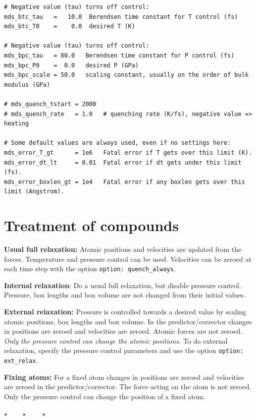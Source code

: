 \documentclass[a4paper,12pt,pdftex,onecolumn]{article}
\newcommand{\stars}{\begin{center}%
\vspace{1em plus 0.5em minus 0.5em}%
$\star \qquad \star \qquad \star$%
\vspace{1em plus 0.5em minus 0.5em}%
\end{center}}
\begin{document}
\begin{Verbatim}[fontsize=\relsize{-1},frame=single]
# Negative value (tau) turns off control:
mds_btc_tau   =   10.0  Berendsen time constant for T control (fs)
mds_btc_T0    =    0.0  desired T (K)

# Negative value (tau) turns off control:
mds_bpc_tau   = 80.0   Berendsen time constant for P control (fs)
mds_bpc_P0    =  0.0   desired P (GPa)
mds_bpc_scale = 50.0   scaling constant, usually on the order of bulk modulus (GPa)

# mds_quench_tstart = 2000
# mds_quench_rate   = 1.0   # quenching rate (K/fs), negative value => heating

# Some default values are always used, even if no settings here:
mds_error_T_gt      = 1e6   Fatal error if T gets over this limit (K).
mds_error_dt_lt     = 0.01  Fatal error if dt gets under this limit (fs).
mds_error_boxlen_gt = 1e4   Fatal error if any boxlen gets over this limit (Angstrom).

\end{Verbatim}




\section{Treatment of compounds}
\label{sec:comptreat}

\textbf{Usual full relaxation:} Atomic positions and
velocities are updated from the forces.
Temperature and pressure control can be used.
Velocities can be zeroed at each time step with the option \verb+option: quench_always+.

\textbf{Internal relaxation}: Do a usual full relaxation, but disable pressure control.
Pressure, box lengths and box volume are not changed from their initial values.

\textbf{External relaxation:} Pressure is controlled towards a desired value by scaling
atomic positions, box lengths and box volume.
In the predictor/corrector changes in positions are zeroed and velocities are zeroed.
Atomic forces are not zeroed.
\textit{Only the pressure control can change the atomic positions.}
To do external relaxation, specify the pressure control parameters and use the
option \verb+option: ext_relax+.

\textbf{Fixing atoms:} For a fixed atom
changes in positions are zeroed and velocities are zeroed
in the predictor/corrector.
The force acting on the atom is not zeroed.
Only the pressure control can change the position of a fixed atom.

\stars
\end{document}
